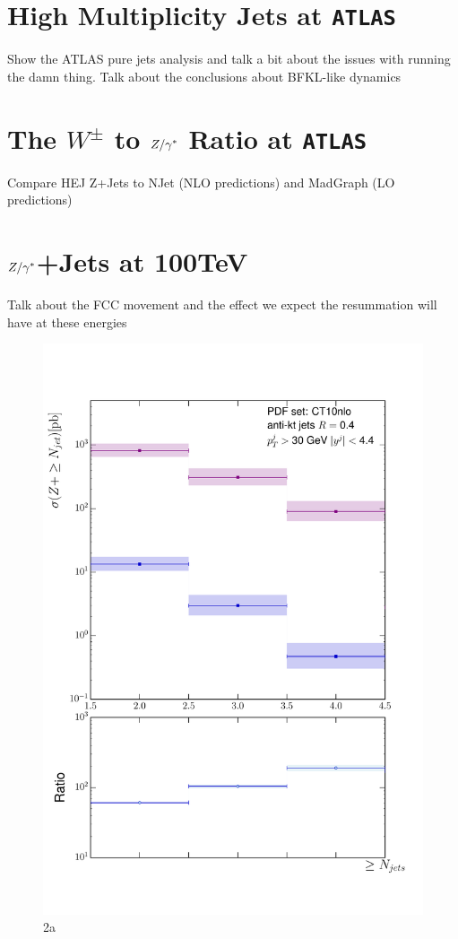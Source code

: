 \chapter{High Multiplicity Jets at \texttt{ATLAS}}
\label{chap:ATLAS}

Show the ATLAS pure jets analysis and talk a bit about the issues with running the damn thing.  Talk about the conclusions about BFKL-like dynamics

\chapter{The $W^\pm$ to $Z/\gamma^*$ Ratio at \texttt{ATLAS}}
\label{chap:WZRatio}

Compare HEJ Z+Jets to NJet (NLO predictions) and MadGraph (LO predictions)

\chapter{$Z/\gamma^*$+Jets at 100TeV}
\label{chap:100TeV}

	Talk about the FCC movement and the effect we expect the resummation will have at these energies

	\begin{figure}[h]
		\centering
		\includegraphics[width=0.8\linewidth]{Figures/ATLAS_Z_100TeV_2a.pdf}
		\caption{2a}
		\label{fig:emissionsites}
	\end{figure}

